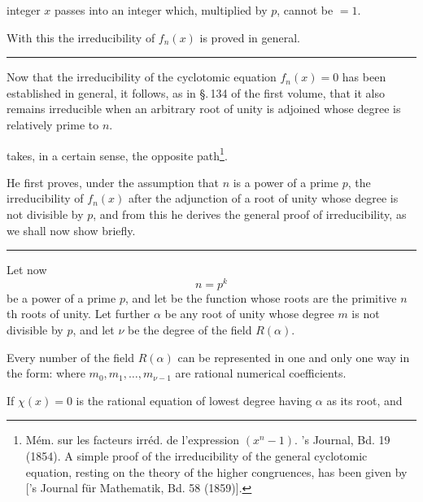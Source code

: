 
integer $x$ passes into an integer which, multiplied by $p$, cannot be $= 1$.

With this the irreducibility of $f_n(x)$ is proved in general.

\begin{center}
\rule{4cm}{0.4pt}
\end{center}

Now that the irreducibility of the cyclotomic equation
$f_n(x) = 0$ has been established in general, it follows, as in \S.\,134 of the
first volume, that it also remains irreducible when an arbitrary root of unity is adjoined whose degree is relatively
prime to $n$.

 takes, in a certain sense, the opposite path\footnote{Mém. sur les facteurs irréd. de l'expression $(x^n-1)$. 's
Journal, Bd. 19 (1854). A simple proof of the irreducibility of the general cyclotomic equation, resting on the theory of the higher congruences,
has been given by  ['s Journal für Mathematik, Bd. 58 (1859)].}.

He first proves, under the assumption that $n$ is a
power of a prime $p$, the irreducibility of $f_n(x)$ after
the adjunction of a root of unity whose degree is not divisible by $p$,
and from this he derives the general proof of irreducibility, as we shall now show briefly.

\begin{center}
\rule{4cm}{0.4pt}
\end{center}

Let now
\[
n = p^k
\]
be a power of a prime $p$, and let
be the function whose roots are the primitive $n$th roots of unity.
Let further $\alpha$ be any root of unity whose degree $m$
is not divisible by $p$, and let $\nu$ be the degree of the field $R(\alpha)$.

Every number of the field $R(\alpha)$ can be represented in one and only
one way in the form:
where $m_0, m_1, \dots, m_{\nu-1}$ are rational numerical coefficients.

If $\chi(x) = 0$ is the rational equation of lowest degree
having $\alpha$ as its root, and
